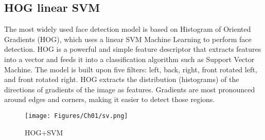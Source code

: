 \subsection{HOG linear SVM}
The most widely used face detection model is based on Histogram of Oriented Gradients (HOG), which uses a linear SVM Machine Learning to perform face detection. HOG is a powerful and simple feature descriptor that extracts features into a vector and feeds it into a classification algorithm such as Support Vector Machine. The model is built upon five filters: left, back, right, front rotated left, and front rotated right. HOG extracts the distribution (histograms) of the directions of gradients of the image as features. Gradients are most pronounced around edges and corners, making it easier to detect those regions.
\begin{figure}[h]
\centering
\texttt{[image: Figures/Ch01/sv.png]}
\caption{HOG+SVM}
\label{figure:1}
\end{figure}
\clearpage
